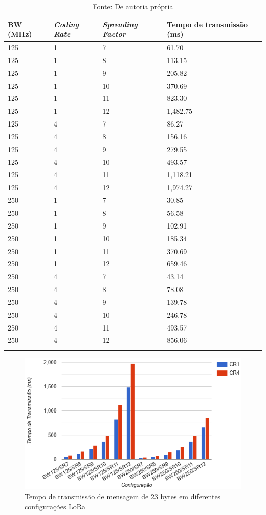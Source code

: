 \documentclass[
	12pt,				%
	openright,			%
	twoside,			%
	a4paper,			%
	english,			%
	french,				%
	spanish,			%
	brazil				%
	]{abntex2}
\begin{document}
\begin{center}
\begin{longtable}{|l|l|l|l|}
\caption{Tempo de transmissão de mensagem de 23 bytes em diferentes configurações LoRa} \label{tab:toa} \\
\hline
BW (MHz) & \textit{Coding Rate} & \textit{Spreading Factor} & Tempo de transmissão (ms) \\ \hline
125 & 1 & 7 & 61.70 \\
125 & 1 & 8 & 113.15 \\
125 & 1 & 9 & 205.82 \\
125 & 1 & 10 & 370.69 \\
125 & 1 & 11 & 823.30 \\
125 & 1 & 12 & 1,482.75 \\
125 & 4 & 7 & 86.27 \\
125 & 4 & 8 & 156.16 \\
125 & 4 & 9 & 279.55 \\
125 & 4 & 10 & 493.57 \\
125 & 4 & 11 & 1,118.21 \\
125 & 4 & 12 & 1,974.27 \\ \hline
250 & 1 & 7 & 30.85 \\
250 & 1 & 8 & 56.58 \\
250 & 1 & 9 & 102.91 \\
250 & 1 & 10 & 185.34 \\
250 & 1 & 11 & 370.69 \\
250 & 1 & 12 & 659.46 \\
250 & 4 & 7 & 43.14 \\
250 & 4 & 8 & 78.08 \\
250 & 4 & 9 & 139.78 \\
250 & 4 & 10 & 246.78 \\
250 & 4 & 11 & 493.57 \\
250 & 4 & 12 & 856.06 \\ \hline
\caption*{Fonte: De autoria própria}
\end{longtable}
\end{center}

\begin{figure}[H]
	\caption{\label{fig:Time}Tempo de transmissão de mensagem de 23 bytes em diferentes configurações LoRa}
	\begin{center}
	    \includegraphics[scale=1]{img/Time.png}
	\end{center}
\end{figure}
\end{document}
